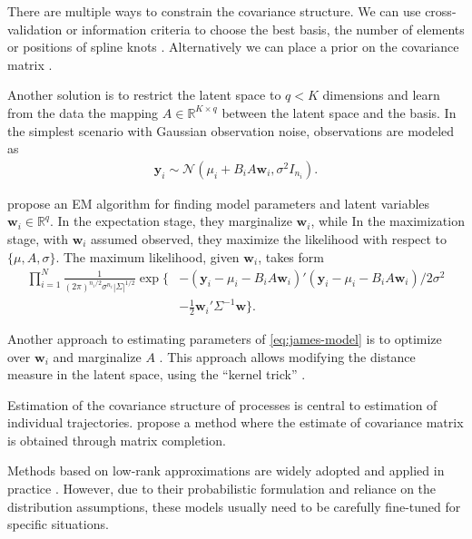 \documentclass[preprint]{imsart}
\numberwithin{equation}{section}
\theoremstyle{plain}
\newcommand{\cN}{\mathcal{N}}
\newcommand{\R}{\mathbb{R}}
\newcommand{\by}{\mathbf{y}}
\newcommand{\bb}{\mathbf{b}}
\newcommand{\bw}{\mathbf{w}}
\begin{document}
There are multiple ways to constrain the covariance structure. We can use cross-validation or information criteria to choose the best basis, the number of elements or positions of spline knots \citep{rice2001nonparametric,bigelow2009bayesian}. Alternatively we can place a prior on the covariance matrix \citep{maclehose2009nonparametric}.

Another solution is to restrict the latent space to $q < K$ dimensions and learn from the data the mapping $A \in \R^{K \times q}$ between the latent space and the basis. In the simplest scenario with Gaussian observation noise, observations are modeled as
\begin{align}\label{eq:james-model}
 \mathbf{y}_i \sim \cN(\mu_i + B_i A \mathbf{w}_i, \sigma^2I_{n_i}).
\end{align}

\citet{james2000principal} propose an EM algorithm for finding model parameters and latent variables $\bw_i \in \R^q$. In the expectation stage, they marginalize $\bw_i$, while %
In the maximization stage, with $\bw_i$ assumed observed, they maximize the likelihood with respect to $\{\mu,A,\sigma\}$. The maximum likelihood, given $\bw_i$, takes form
\begin{align*}
\prod_{i=1}^N \frac{1}{(2\pi)^{n_i/2} \sigma^{n_i} |\Sigma|^{1/2}} \exp\{ &-(\by_i - \mu_i - B_i A \bw_i)'(\by_i - \mu_i - B_i A \bw_i) / 2\sigma^2 \nonumber\\
&- \frac{1}{2}\bw_i' \Sigma^{-1} \bw \}.\label{eq:likelihood}
\end{align*}

Another approach to estimating parameters of \eqref{eq:james-model} is to optimize over $\bw_i$ and marginalize $A$ \citep{lawrence2004gaussian}. This approach allows modifying the distance measure in the latent space, using the ``kernel trick'' \citep{schulam2016disease}.

Estimation of the covariance structure of processes is central to estimation of individual trajectories. \citet{descary2016functional} propose a method where the estimate of covariance matrix is obtained through matrix completion.

Methods based on low-rank approximations are widely adopted and applied in practice \citep{berkey1983longitudinal, yan2017dynamic, hall2006properties, besse1986principal, yao2006penalized, greven2011longitudinal}. However, due to their probabilistic formulation and reliance on the distribution assumptions, these models usually need to be carefully fine-tuned for specific situations.
\end{document}
